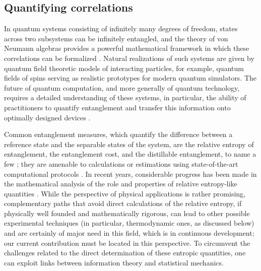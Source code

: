 \documentclass[a4paper, twoside, 11pt, reqno]{amsart}
\theoremstyle{definition}
\theoremstyle{plain}
\newcommand{\1}{\mathbf{1}}
\begin{document}
\subsection{Quantifying correlations}

In quantum systems consisting of infinitely many degrees of freedom, states across two subsystems can be infinitely entangled, and the theory of von Neumann algebras provides a powerful mathematical framework in which these correlations can be formalized \cite{Keyl2003, vanLuijk2025cmp, Verch2005}. Natural realizations of such systems are given by quantum field theoretic models of interacting particles, for example, quantum fields of spins serving as realistic prototypes for modern quantum simulators. The future of quantum computation, and more generally of quantum technology, requires a detailed understanding of these systems, in particular, the ability of practitioners to quantify entanglement and transfer this information onto optimally designed devices \cite{Amico2008, Kinoshita2025}.

Common entanglement measures, which quantify the difference between a reference state and the separable states of the system, are the relative entropy of entanglement, the entanglement cost, and the distillable entanglement, to name a few \cite{Horodecki2009, Plenio2007, Vedral1998, Vedral1997}; they are amenable to calculations or estimations using state-of-the-art computational protocols \cite{Feng2024, Koutny2023}. In recent years, considerable progress has been made in the mathematical analysis of the role and properties of relative entropy-like quantities \cite{Hiai2021mps, Rubboli2024, Vedral2002}. While the perspective of physical applications is rather promising, complementary paths that avoid direct calculations of the relative entropy, if physically well founded and mathematically rigorous, can lead to other possible experimental techniques (in particular, thermodynamic ones, as discussed below) and are certainly of major need in this field, which is in continuous development; our current contribution must be located in this perspective. To circumvent the challenges related to the direct determination of these entropic quantities, one can exploit links between information theory and statistical mechanics.
\end{document}

